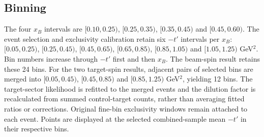 \subsection{Binning}\label{sec:release_binning}
The four $x_B$ intervals are $[0.10,0.25)$, $[0.25,0.35)$, $[0.35,0.45)$ and $[0.45,0.60)$. The event selection and exclusivity calibration retain six $-t'$ intervals per $x_B$: $[0.05,0.25)$, $[0.25,0.45)$, $[0.45,0.65)$, $[0.65,0.85)$, $[0.85,1.05)$ and $[1.05,1.25)$ GeV$^2$. Bin numbers increase through $-t'$ first and then $x_B$.
The beam-spin result retains these 24 bins. For the two target-spin results, adjacent pairs of selected bins are merged into $[0.05,0.45)$, $[0.45,0.85)$ and $[0.85,1.25)$ GeV$^2$, yielding 12 bins. The target-sector likelihood is refitted to the merged events and the dilution factor is recalculated from summed control-target counts, rather than averaging fitted ratios or corrections. Original fine-bin exclusivity windows remain attached to each event. Points are displayed at the selected combined-sample mean $-t'$ in their respective bins.

\clearpage

